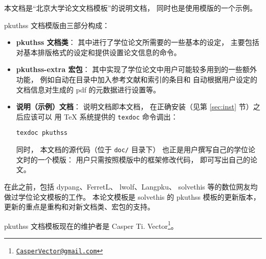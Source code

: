 

本文档是“北京大学论文文档模板”的说明文档，
同时也是使用模版的一个示例。

pkuthss 文档模版由三部分构成：
\begin{itemize}
	\item \textbf{pkuthss 文档类}：
		其中进行了学位论文所需要的一些基本的设定，
		主要包括对基本排版格式的设定和提供设置论文信息的命令。
	\item \textbf{pkuthss-extra 宏包}：
		其中实现了学位论文中用户可能较多用到的一些额外功能，
		例如自动在目录中加入参考文献和索引的条目和%
		自动根据用户设定的文档信息对生成的 pdf 的元数据进行设置等。
	\item \textbf{说明（示例）文档}：
		说明文档即本文档，
		在正确安装（见第 \ref{sec:inst} 节）之后应该可以%
		用 \TeX{} 系统提供的 \verb|texdoc| 命令调出：
\begin{Verbatim}[frame=single]
texdoc pkuthss
\end{Verbatim}
		同时，
		本文档的源代码（位于 \verb|doc/| 目录下）%
		也正是用户撰写自己的学位论文时的一个模版：
		用户只需按照模版中的框架修改代码，
		即可写出自己的论文。
\end{itemize}

在此之前，包括 dypang\cite{dypang}、FerretL\cite{FerretL}、%
lwolf\cite{lwolf}、Langpku\cite{Langpku}、%
solvethis\cite{solvethis} 等的数位网友均做过学位论文模板的工作。
本论文模板是 solvethis 的 pkuthss 模板的更新版本，
更新的重点是重构和对新文档类、宏包的支持。

pkuthss 文档模板现在的维护者是 Casper Ti. Vector\footnote%
{\href{CasperVector@gmail.com}{\texttt{CasperVector@gmail.com}}}。

